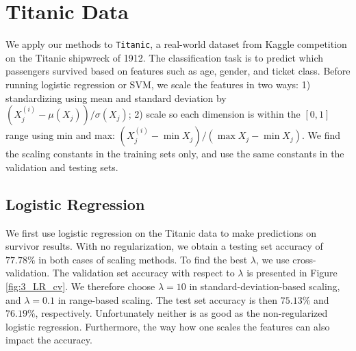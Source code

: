 
\section{Titanic Data}\label{sec:titanic}
We apply our methods to \texttt{Titanic}, a real-world dataset from Kaggle competition on the Titanic shipwreck of 1912.  The classification task is to predict which passengers survived based on features such as age, gender, and ticket class.  Before running logistic regression or SVM, we scale the features in two ways: 1) standardizing using mean and standard deviation by $(X_{j}^{(i)} - \mu(X_{j}))/\sigma(X_{j})$; 2) scale so each dimension is within the $[0, 1]$ range using min and max: $(X_{j}^{(i)} - \min{X_j})/(\max{X_j} - \min{X_j})$. We find the scaling constants in the training sets only, and use the same constants in the validation and testing sets. 


\subsection{Logistic Regression}
We first use logistic regression on the Titanic data to make predictions on survivor results. With no regularization, we obtain a testing set accuracy of $77.78\%$ in both cases of scaling methods. To find the best $\lambda$, we use cross-validation. The validation set accuracy with respect to $\lambda$ is presented in Figure \ref{fig:3_LR_cv}. We therefore choose $\lambda = 10$ in standard-deviation-based scaling, and $\lambda = 0.1$ in range-based scaling. The test set accuracy is then $75.13\%$ and $76.19\%$, respectively. Unfortunately neither is as good as the non-regularized logistic regression. Furthermore, the way how one scales the features can also impact the accuracy.

